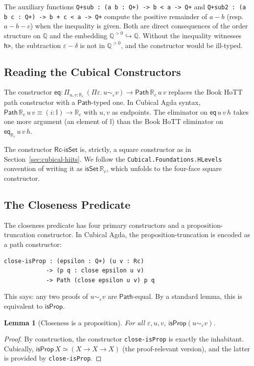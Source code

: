 \documentclass[12pt]{article}
\newtheorem{lemma}[theorem]{Lemma}
\theoremstyle{definition}
\theoremstyle{remark}
\newcommand{\Q}{\mathbb{Q}}
\newcommand{\Rc}{\mathbb{R}_{c}}
\newcommand{\eqv}{\simeq}
\newcommand{\Path}{\mathsf{Path}}
\newcommand{\II}{\mathbb{I}}
\newcommand{\isProp}{\mathsf{isProp}}
\newcommand{\close}{\mathrel{\sim}}
\begin{document}
The auxiliary functions \texttt{Q+sub : (a b : Q+) -> b < a -> Q+}
and \texttt{Q+sub2 : (a b c : Q+) -> b + c < a -> Q+} compute the
positive remainder of $a - b$ (resp.\ $a - b - c$) when the
inequality is given. Both are direct consequences of the order
structure on $\Q$ and the embedding $\Q^{>0} \hookrightarrow \Q$.
Without the inequality witnesses \texttt{h>}, the subtraction
$\varepsilon - \delta$ is not in $\Q^{>0}$, and the constructor would
be ill-typed.

\subsection{Reading the Cubical Constructors}

The constructor $\mathsf{eq} : \Pi_{u, v : \Rc}\,(\Pi\varepsilon.\, u \close_\varepsilon v) \to \Path\,\Rc\,u\,v$ replaces the
Book HoTT path constructor with a $\Path$-typed one. In Cubical Agda
syntax, $\Path\,\Rc\,u\,v \equiv (i : \II) \to \Rc$ with $u, v$ as
endpoints. The eliminator on $\mathsf{eq}\,u\,v\,h$ takes one more
argument (an element of $\II$) than the Book HoTT eliminator on
$\mathsf{eq}_{\Rc}\,u\,v\,h$.

The constructor $\mathsf{Rc\text{-}isSet}$ is, strictly, a square
constructor as in Section~\ref{sec:cubical-hiits}. We follow the
\texttt{Cubical.Foundations.HLevels} convention of writing it as
$\mathsf{isSet}\,\Rc$, which unfolds to the four-face square constructor.

\subsection{The Closeness Predicate}

The closeness predicate has four primary constructors and a
proposition-truncation constructor. In Cubical Agda, the
proposition-truncation is encoded as a path constructor:
\begin{lstlisting}
close-isProp : (epsilon : Q+) (u v : Rc)
            -> (p q : close epsilon u v)
            -> Path (close epsilon u v) p q
\end{lstlisting}
This says: any two proofs of $u \close_\varepsilon v$ are
$\Path$-equal. By a standard lemma, this is equivalent to
$\isProp$.

\begin{lemma}[Closeness is a proposition]
\label{lem:close-isProp}
For all $\varepsilon, u, v$, $\isProp(u \close_\varepsilon v)$.
\end{lemma}
\begin{proof}
By construction, the constructor \texttt{close-isProp} is exactly the
inhabitant. Cubically, $\isProp\,X \eqv (X \to X \to X)$ (the
proof-relevant version), and the latter is provided by
\texttt{close-isProp}.
\end{proof}
\end{document}
